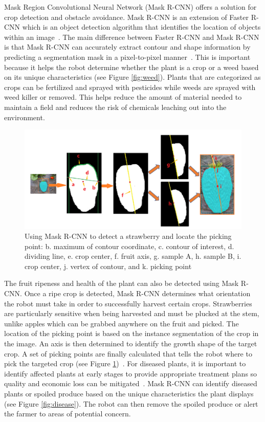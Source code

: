 \documentclass[12pt]{article}
\begin{document}
Mask Region Convolutional Neural Network (Mask R-CNN) offers a solution for crop detection and obstacle avoidance. Mask R-CNN is an extension of Faster R-CNN which is an object detection algorithm that identifies the location of objects within an image~\cite{dollar2017mask, yu2019fruit, chu2021deep}. The main difference between Faster R-CNN and Mask R-CNN is that Mask R-CNN can accurately extract contour and shape information by predicting a segmentation mask in a pixel-to-pixel manner~\cite{dollar2017mask, yu2019fruit}. This is important because it helps the robot determine whether the plant is a crop or a weed based on its unique characteristics (see Figure \ref{fig:weed}). Plants that are categorized as crops can be fertilized and sprayed with pesticides while weeds are sprayed with weed killer or removed. This helps reduce the amount of material needed to maintain a field and reduces the risk of chemicals leaching out into the environment.

\begin{figure}[h!]
\centering
\includegraphics[width=1.0\textwidth]{locStem.PNG}
\caption{Using Mask R-CNN to detect a strawberry and locate the picking point: b. maximum of contour coordinate, c. contour of interest, d. dividing line, e. crop center, f. fruit axis, g. sample A, h. sample B, i. crop center, j. vertex of contour, and k. picking point~\cite{yu2019fruit}}
\label{fig:picking}
\end{figure}

The fruit ripeness and health of the plant can also be detected using Mask R-CNN. Once a ripe crop is detected, Mask R-CNN determines what orientation the robot must take in order to successfully harvest certain crops. Strawberries are particularly sensitive when being harvested and must be plucked at the stem, unlike apples which can be grabbed anywhere on the fruit and picked. The location of the picking point is based on the instance segmentation of the crop in the image. An axis is then determined to identify the growth shape of the target crop. A set of picking points are finally calculated that tells the robot where to pick the targeted crop (see Figure \ref{fig:picking})~\cite{yu2019fruit}. For diseased plants, it is important to identify affected plants at early stages to provide appropriate treatment plans so quality and economic loss can be mitigated~\cite{afzaal2021instance}. Mask R-CNN can identify diseased plants or spoiled produce based on the unique characteristics the plant displays (see Figure \ref{fig:disease}). The robot can then remove the spoiled produce or alert the farmer to areas of potential concern.
\end{document}
